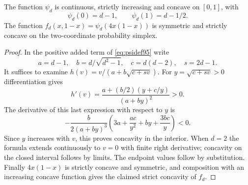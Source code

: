 \begin{lemma}
\label{lem:psiconcavity95}
The function $\psi_d$ is continuous, strictly increasing and concave
on $[0,1]$, with
\[
 \psi_d(0)=d-1,\qquad\psi_d(1)=d-1/2.
\]
The function $f_d(x,1-x)=\psi_d(4x(1-x))$ is symmetric and
strictly concave on the two-coordinate probability simplex.
\end{lemma}
\begin{proof}
In the positive added term of \eqref{eq:psidef95} write
\[
 a=d-1,\quad b=d/\sqrt{d^2-1},\quad c=d(d-2),\quad s=2d-1.
\]
It suffices to examine $h(v)=v/(a+b\sqrt{c+sv})$.
For $y=\sqrt{c+sv}>0$ differentiation gives
\[
 h'(v)=\frac{a+(b/2)(y+c/y)}{(a+by)^2}>0.
\]
The derivative of this last expression with respect to $y$ is
\[
 -\frac{b}{2(a+by)^3}
       \left(3a+\frac{ac}{y^2}+by+\frac{3bc}{y}\right)<0.
\]
Since $y$ increases with $v$, this proves concavity in the interior.
When $d=2$ the formula extends continuously to $v=0$ with finite
right derivative; concavity on the closed interval follows by limits.
The endpoint values follow by substitution.  Finally $4x(1-x)$
is strictly concave and symmetric, and composition with an increasing
concave function gives the claimed strict concavity of $f_d$.
\end{proof}

